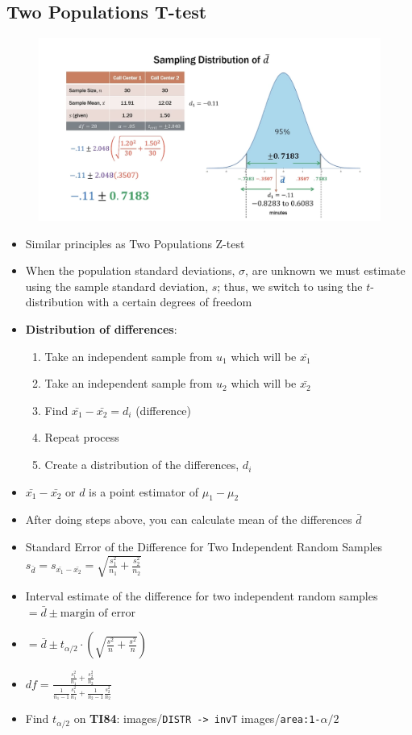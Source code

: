 \documentclass{article}
\newcommand{\code}[1]{images/\colorbox{light-gray}{\texttt{#1}}}
\begin{document}
\subsection{Two Populations T-test}

\begin{figure}[H]
    \centering
    \includegraphics[width=1\linewidth]{images/2samptexample.png}
\end{figure}

\begin{itemize}
    \item Similar principles as Two Populations Z-test
    \item When the population standard deviations, $\sigma$, are unknown we must estimate using the sample standard deviation, $s$; thus, we switch to using the $t$-distribution with a certain degrees of freedom
    \item \textbf{Distribution of differences}:
    \begin{enumerate}
        \item Take an independent sample from $u_1$ which will be $\bar{x_1}$
        \item Take an independent sample from $u_2$ which will be $\bar{x_2}$
        \item Find $\bar{x_1}-\bar{x_2}=d_i$ (difference)
        \item Repeat process
        \item Create a distribution of the differences, $d_i$ 
    \end{enumerate}
    \item $\bar{x_1}-\bar{x_2}$ or $d$ is a point estimator of $\mu_1-\mu_2$
    \item After doing steps above, you can calculate mean of the differences $\bar{d}$
    \item Standard Error of the Difference for Two Independent Random Samples $s_{\bar{d}}=s_{\bar{x_1}-\bar{x_2}}=\sqrt{\frac{s_1^2}{n_1}+\frac{s_2^2}{n_2}}$
    \item Interval estimate of the difference for two independent random samples $=\bar{d} \pm \text{margin of error}$
    \item $=\bar{d} \pm t_{\alpha/2} \cdot (\sqrt{\frac{s^2}{n}+\frac{s^2}{n}})$
    \item $df=\frac{\frac{s_1^2}{n_1}+\frac{s_2^2}{n_2}}{\frac{1}{n_1-1}\frac{s_1^2}{n_1}+\frac{1}{n_2-1}\frac{s_2^2}{n_2}}$
    \item Find $t_{\alpha/2}$ on \textbf{TI84}: \code{DISTR -> invT} \code{area:1-$\alpha/2$}
\end{itemize}
\end{document}
